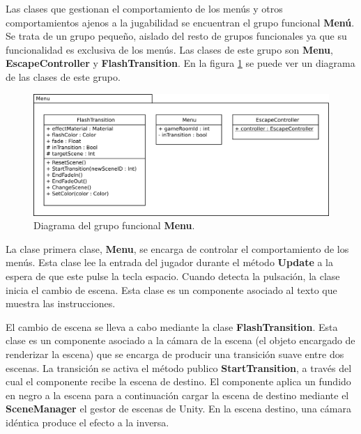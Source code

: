 Las clases que gestionan el comportamiento de los menús y otros comportamientos ajenos a la jugabilidad se encuentran el grupo funcional \textbf{Menú}. Se trata de un grupo pequeño, aislado del resto de grupos funcionales ya que su funcionalidad es exclusiva de los menús. Las clases de este grupo son \textbf{Menu}, \textbf{EscapeController} y \textbf{FlashTransition}. En la figura \ref{diagrama_clases} se puede ver un diagrama de las clases de este grupo.
\begin{figure}[!t]
    \centering
    \includegraphics[width=1\textwidth]{images/estructura/menu/class_diagram}
    \caption{Diagrama del grupo funcional \textbf{Menu}.}
    \label{diagrama_clases}
\end{figure}

La clase primera clase, \textbf{Menu}, se encarga de controlar el comportamiento de los menús. Esta clase lee la entrada del jugador durante el método \textbf{Update} a la espera de que este pulse la tecla espacio. Cuando detecta la pulsación, la clase inicia el cambio de escena. Esta clase es un componente asociado al texto que muestra las instrucciones.

El cambio de escena se lleva a cabo mediante la clase \textbf{FlashTransition}. Esta clase es un componente asociado a la cámara de la escena (el objeto encargado de renderizar la escena) que se encarga de producir una transición suave entre dos escenas. La transición se activa el método publico \textbf{StartTransition}, a través del cual el componente recibe la escena de destino. El componente aplica un fundido en negro a la escena para a continuación cargar la escena de destino mediante el \textbf{SceneManager} el gestor de escenas de Unity. En la escena destino, una cámara idéntica produce el efecto a la inversa.

